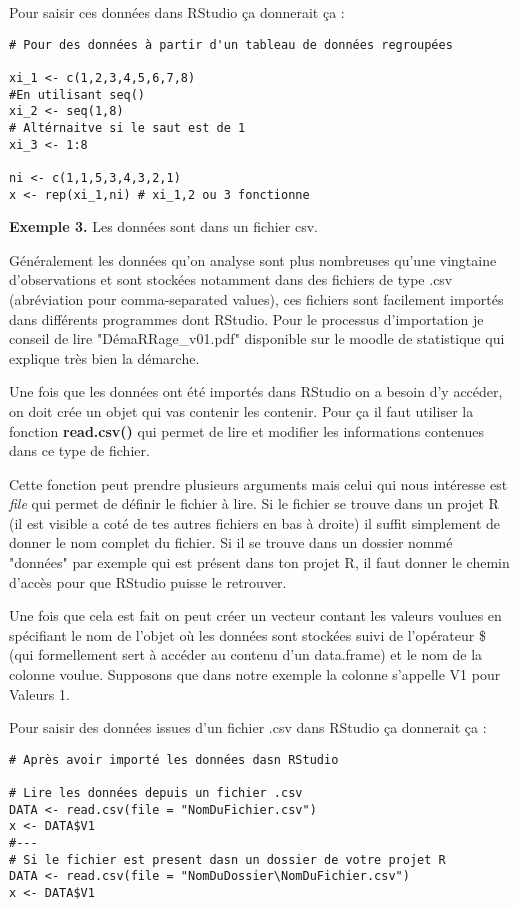 \documentclass{report}
\begin{document}
Pour saisir ces données dans RStudio ça donnerait ça :

\begin{verbatim}
# Pour des données à partir d'un tableau de données regroupées 

xi_1 <- c(1,2,3,4,5,6,7,8)
#En utilisant seq()
xi_2 <- seq(1,8)
# Altérnaitve si le saut est de 1
xi_3 <- 1:8

ni <- c(1,1,5,3,4,3,2,1)
x <- rep(xi_1,ni) # xi_1,2 ou 3 fonctionne
\end{verbatim}

\textbf{Exemple 3.} Les données sont dans un fichier csv. 

Généralement les données qu'on analyse sont plus nombreuses qu'une vingtaine d'observations et sont stockées notamment dans des fichiers de type .csv (abréviation pour comma-separated values), ces fichiers sont facilement importés dans différents programmes dont RStudio. Pour le processus d'importation je conseil de lire "DémaRRage\_v01.pdf" disponible sur le moodle de statistique qui explique très bien la démarche.

Une fois que les données ont été importés dans RStudio on a besoin d'y accéder, on doit crée un objet qui vas contenir les contenir. Pour ça il faut utiliser la fonction \textbf{read.csv()} qui permet de lire et modifier les informations contenues dans ce type de fichier.

Cette fonction peut prendre plusieurs arguments mais celui qui nous intéresse est \textit{file} qui permet de définir le fichier à lire. Si le fichier se trouve dans un projet R (il est visible a coté de tes autres fichiers en bas à droite) il suffit simplement de donner le nom complet du fichier. Si il se trouve dans un dossier nommé "données" par exemple qui est présent dans ton projet R, il faut donner le chemin d'accès pour que RStudio puisse le retrouver.

Une fois que cela est fait on peut créer un vecteur contant les valeurs voulues en spécifiant le nom de l'objet où les données sont stockées suivi de l'opérateur \$ (qui formellement sert à accéder au contenu d'un data.frame) et le nom de la colonne voulue. Supposons que dans notre exemple la colonne s'appelle V1 pour Valeurs 1.

Pour saisir des données issues d'un fichier .csv dans RStudio ça donnerait ça :

\begin{verbatim}
# Après avoir importé les données dasn RStudio

# Lire les données depuis un fichier .csv
DATA <- read.csv(file = "NomDuFichier.csv")
x <- DATA$V1
#---
# Si le fichier est present dasn un dossier de votre projet R
DATA <- read.csv(file = "NomDuDossier\NomDuFichier.csv")
x <- DATA$V1
\end{verbatim}
\end{document}
